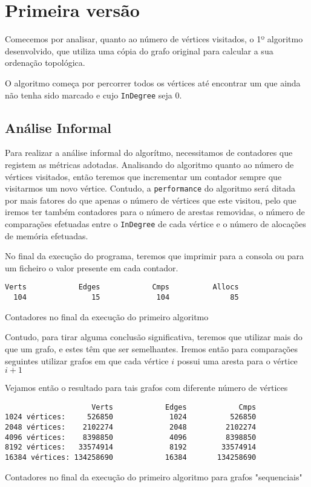 \section{Primeira versão}
Comecemos por analisar, quanto ao número de vértices visitados, o 1º algoritmo desenvolvido, que utiliza
uma cópia do grafo original para calcular a sua ordenação
topológica. 

O algoritmo começa por percorrer todos os vértices até encontrar
um que ainda não tenha sido marcado e cujo \verb|InDegree| seja
0. 


\subsection{Análise Informal}

Para realizar a análise informal do algorítmo, necessitamos de
contadores que registem as métricas adotadas. Analisando do
algoritmo quanto ao número de vértices visitados, então teremos
que incrementar um contador sempre que visitarmos um novo
vértice. Contudo, a \verb|performance| do algoritmo será ditada
por mais fatores do que apenas o número de vértices que este
visitou, pelo que iremos ter também contadores para o número de
arestas removidas, o número de comparações efetuadas entre o
\verb|InDegree| de cada vértice e o número de alocações de
memória efetuadas.

No final da execução do programa, teremos que imprimir para a
consola ou para um ficheiro o valor presente em cada contador.

\begin{listing}[H]
\centering
\begin{verbatim}
Verts	         Edges	          Cmps	        Allocs
  104	            15	           104	            85
\end{verbatim}
\caption{Contadores no final da execução do primeiro algoritmo}
\end{listing}

Contudo, para tirar alguma conclusão significativa, teremos que
utilizar mais do que um grafo, e estes têm que ser semelhantes.
Iremos então para comparações seguintes utilizar grafos em que
cada vértice $i$ possui uma aresta para o vértice $i+1$


Vejamos então o resultado para tais grafos com diferente número
de vértices

\begin{listing}[H]
\centering
\begin{verbatim}
                    Verts	         Edges	          Cmps
1024 vértices:     526850	          1024	        526850
2048 vértices:    2102274	          2048	       2102274
4096 vértices:    8398850	          4096	       8398850
8192 vértices:   33574914	          8192	      33574914
16384 vértices: 134258690	         16384	     134258690
\end{verbatim}
\caption{Contadores no final da execução do primeiro algoritmo
para grafos "sequenciais"}
\end{listing}

